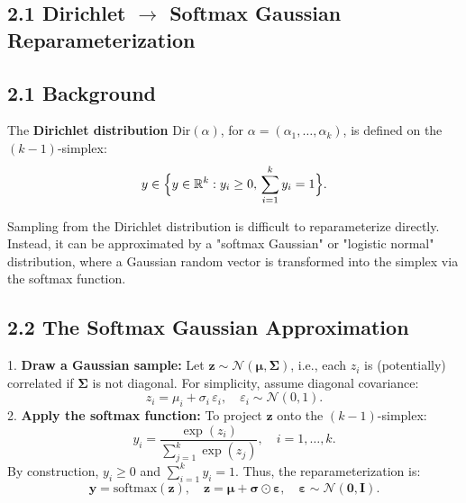 \documentclass{article}
\begin{document}
\subsection*{2.1 Dirichlet \(\rightarrow\) Softmax Gaussian Reparameterization}

\subsection*{2.1 Background}
The \textbf{Dirichlet distribution} \(\mathrm{Dir}(\alpha)\), for \(\alpha = (\alpha_1, \dots, \alpha_k)\), is defined on the \((k-1)\)-simplex:
\[
y \in \Bigl\{ y \in \mathbb{R}^k : y_i \geq 0, \, \sum_{i=1}^k y_i = 1 \Bigr\}.
\]

Sampling from the Dirichlet distribution is difficult to reparameterize directly. Instead, it can be approximated by a "softmax Gaussian" or "logistic normal" distribution, where a Gaussian random vector is transformed into the simplex via the softmax function.

\subsection*{2.2 The Softmax Gaussian Approximation}
1. \textbf{Draw a Gaussian sample:} Let \(\bm{z} \sim \mathcal{N}(\bm{\mu}, \bm{\Sigma})\), i.e., each \(z_i\) is (potentially) correlated if \(\bm{\Sigma}\) is not diagonal. For simplicity, assume diagonal covariance:
\[
z_i = \mu_i + \sigma_i \, \varepsilon_i, \quad \varepsilon_i \sim \mathcal{N}(0, 1).
\]
2. \textbf{Apply the softmax function:} To project \(\bm{z}\) onto the \((k-1)\)-simplex:
\[
y_i = \frac{\exp(z_i)}{\sum_{j=1}^k \exp(z_j)}, \quad i = 1, \dots, k.
\]
By construction, \(y_i \geq 0\) and \(\sum_{i=1}^k y_i = 1\). Thus, the reparameterization is:
\[
\boxed{\bm{y} = \mathrm{softmax}(\bm{z}), \quad \bm{z} = \bm{\mu} + \bm{\sigma} \odot \bm{\varepsilon}, \quad \bm{\varepsilon} \sim \mathcal{N}(\bm{0}, \bm{I}).}
\]


\end{document}
